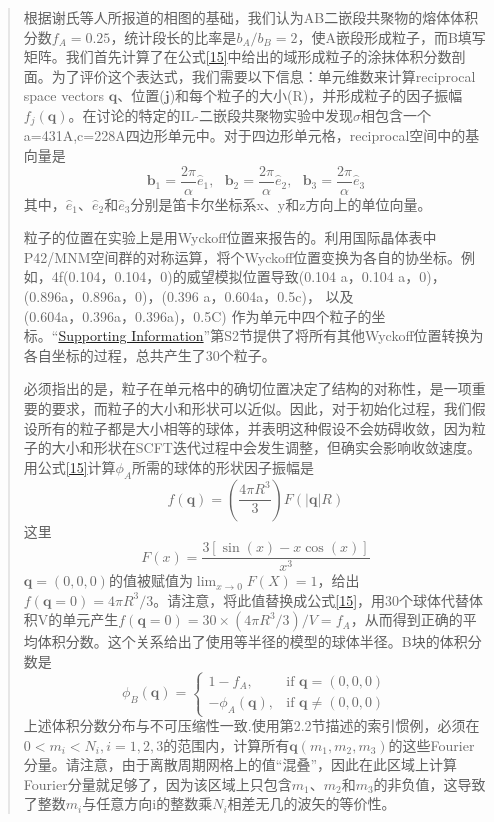 \documentclass{article}
\begin{document}
\begin{CJK}{UTF8}{gkai}
\begin{quotation}
根据谢氏等人所报道的相图的基础，我们认为AB二嵌段共聚物的熔体体积分数$f_A=0.25$，统计段长的比率是$b_A/b_B=2$，使A嵌段形成粒子，而B填写矩阵。我们首先计算了在公式\ref{15}中给出的域形成粒子的涂抹体积分数剖面。为了评价这个表达式，我们需要以下信息：单元维数来计算reciprocal space vectors $\mathbf{q}$、位置($\mathbf{j}$)和每个粒子的大小(R)，并形成粒子的因子振幅$f_j(\mathbf{q})$。在讨论的特定的IL-二嵌段共聚物实验中发现$\sigma$相包含一个a=431A,c=228A四边形单元中。对于四边形单元格，reciprocal空间中的基向量是
\begin{equation}\label{17}
\mathbf{b}_1=\frac{2\pi}{\alpha}\hat{e}_1,~~~\mathbf{b}_2=\frac{2\pi}{\alpha}\hat{e}_2,~~~\mathbf{b}_3=\frac{2\pi}{\alpha}\hat{e}_3
\end{equation}
其中，$\hat{e}_1$、$\hat{e}_2$和$\hat{e}_3$分别是笛卡尔坐标系x、y和z方向上的单位向量。

粒子的位置在实验上是用Wyckoff位置来报告的。利用国际晶体表中P42/MNM空间群的对称运算，将个Wyckoff位置变换为各自的协坐标。例如，4f(0.104，0.104，0)的威望模拟位置导致(0.104 a，0.104 a，0)，(0.896a，0.896a，0)，(0.396 a，0.604a，0.5c)，
以及\\
(0.604a，0.396a，0.396a)，0.5C)
作为单元中四个粒子的坐标。“\href{http://pubs.acs.org/doi/suppl/10.1021/acs.macromol.6b00107/suppl_file/ma6b00107_si_001.pdf}{Supporting Information}”第S2节提供了将所有其他Wyckoff位置转换为各自坐标的过程，总共产生了30个粒子。

必须指出的是，粒子在单元格中的确切位置决定了结构的对称性，是一项重要的要求，而粒子的大小和形状可以近似。因此，对于初始化过程，我们假设所有的粒子都是大小相等的球体，并表明这种假设不会妨碍收敛，因为粒子的大小和形状在SCFT迭代过程中会发生调整，但确实会影响收敛速度。用公式\ref{15}计算$\phi _A$所需的球体的形状因子振幅是
\begin{equation}\label{18}
f(\mathbf{q})=\left( \frac{4\pi R^3}{3} \right)F(|\mathbf{q}|R)
\end{equation}
这里
\begin{equation}\label{19}
F(x)=\frac{3\left[ \sin(x) -x\cos(x) \right]}{x^3}
\end{equation}
$\mathbf{q}=(0,0,0)$的值被赋值为$\lim _{x\rightarrow 0} F(X)=1$，给出$f(\mathbf{q}=0)=4\pi R^3/3$。请注意，将此值替换成公式\ref{15}，用30个球体代替体积V的单元产生$f(\mathbf{q}=0)=30×(4\pi R^3/3)/V=f_A$，从而得到正确的平均体积分数。这个关系给出了使用等半径的模型的球体半径。B块的体积分数是
\begin{equation}\label{20}
\phi _B(\mathbf{q}) =
\begin{cases}
1-f_A, & \mbox{if }\mathbf{q}=(0,0,0)\\
-\phi _A(\mathbf{q}), & \mbox{if }\mathbf{q}\neq (0,0,0)
\end{cases}
\end{equation}
上述体积分数分布与不可压缩性一致.使用第2.2节描述的索引惯例，必须在$0<m_i<N_i,i=1,2,3$的范围内，计算所有$\mathbf{q}(m_1,m_2,m_3)$的这些Fourier分量。请注意，由于离散周期网格上的值“混叠”，因此在此区域上计算Fourier分量就足够了，因为该区域上只包含$m_1$、$m_2$和$m_3$的非负值，这导致了整数$m_i$与任意方向i的整数乘$N_i$相差无几的波矢的等价性。


\end{quotation}
\end{CJK}
\end{document}
